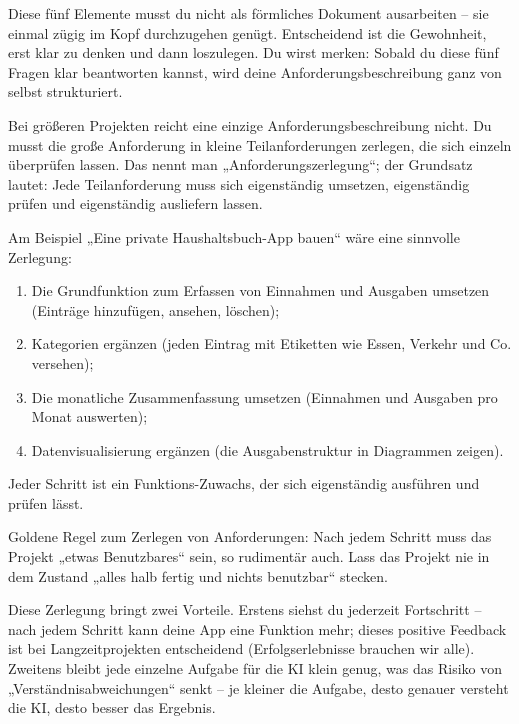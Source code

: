 Diese fünf Elemente musst du nicht als förmliches Dokument ausarbeiten – sie einmal zügig im Kopf durchzugehen genügt. Entscheidend ist die Gewohnheit, erst klar zu denken und dann loszulegen. Du wirst merken: Sobald du diese fünf Fragen klar beantworten kannst, wird deine Anforderungsbeschreibung ganz von selbst strukturiert.


Bei größeren Projekten reicht eine einzige Anforderungsbeschreibung nicht. Du musst die große Anforderung in kleine Teilanforderungen zerlegen, die sich einzeln überprüfen lassen. Das nennt man „Anforderungszerlegung“; der Grundsatz lautet: Jede Teilanforderung muss sich eigenständig umsetzen, eigenständig prüfen und eigenständig ausliefern lassen.

Am Beispiel „Eine private Haushaltsbuch-App bauen“ wäre eine sinnvolle Zerlegung:

\begin{enumerate}
  \item Die Grundfunktion zum Erfassen von Einnahmen und Ausgaben umsetzen (Einträge hinzufügen, ansehen, löschen);
  \item Kategorien ergänzen (jeden Eintrag mit Etiketten wie Essen, Verkehr und Co. versehen);
  \item Die monatliche Zusammenfassung umsetzen (Einnahmen und Ausgaben pro Monat auswerten);
  \item Datenvisualisierung ergänzen (die Ausgabenstruktur in Diagrammen zeigen).
\end{enumerate}

Jeder Schritt ist ein Funktions-Zuwachs, der sich eigenständig ausführen und prüfen lässt.

Goldene Regel zum Zerlegen von Anforderungen: Nach jedem Schritt muss das Projekt „etwas Benutzbares“ sein, so rudimentär auch. Lass das Projekt nie in dem Zustand „alles halb fertig und nichts benutzbar“ stecken.

Diese Zerlegung bringt zwei Vorteile. Erstens siehst du jederzeit Fortschritt – nach jedem Schritt kann deine App eine Funktion mehr; dieses positive Feedback ist bei Langzeitprojekten entscheidend (Erfolgserlebnisse brauchen wir alle). Zweitens bleibt jede einzelne Aufgabe für die KI klein genug, was das Risiko von „Verständnisabweichungen“ senkt – je kleiner die Aufgabe, desto genauer versteht die KI, desto besser das Ergebnis.


